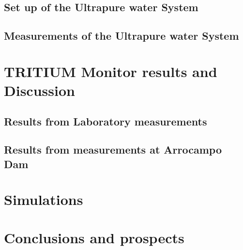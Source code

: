 \documentclass[12pt,a4paper]{book}
\begin{document}
	\section{Set up of the Ultrapure water System}
	\newpage
	
	\section{Measurements of the Ultrapure water System}
	\newpage
	
\chapter[Results and Discussion]{TRITIUM Monitor results and Discussion}\label{chap:Results}
	\section{Results from Laboratory measurements}
	\newpage
		
	\section{Results from measurements at Arrocampo Dam}
	\newpage	

\chapter{Simulations}  \label{chap:Simulations}
%
\newpage	

\chapter{Conclusions and prospects}  \label{chap:Conclusions}
%
\newpage



%
	
\end{document}
